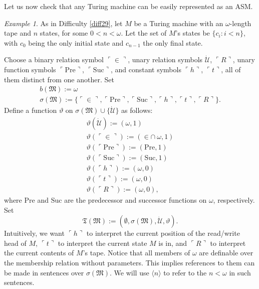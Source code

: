 \documentclass[12pt, twoside]{memoir}
\numberwithin{equation}{section}
\theoremstyle{definition}
\theoremstyle{remark}
\newtheorem{ex}[thm]{Example}
\theoremstyle{definition}
\theoremstyle{definition}
\theoremstyle{definition}
\theoremstyle{remark}
\begin{document}
Let us now check that any Turing machine can be easily represented as an ASM.

\begin{ex}\label{ex212}
As in Difficulty \ref{diff29}, let $M$ be a Turing machine with an $\omega$-length tape and $n$ states, for some $0 < n < \omega$. Let the set of $M$'s states be $\{c_i : i < n\}$, with $c_0$ being the only initial state and $c_{n-1}$ the only final state. 

Choose a binary relation symbol $\ulcorner \in \urcorner$, unary relation symbols $\dot{\mathcal{U}}$, $\ulcorner R \urcorner$, unary function symbols $\ulcorner \mathrm{Pre} \urcorner$, $\ulcorner \mathrm{Suc} \urcorner$, and constant symbols $\ulcorner h \urcorner$, $\ulcorner t \urcorner$, all of them distinct from one another. Set 
\begin{gather*}
    b(\mathfrak{M}) := \omega \\
    \sigma(\mathfrak{M}) := \{\ulcorner \in \urcorner, \ulcorner \mathrm{Pre} \urcorner, \ulcorner \mathrm{Suc} \urcorner, \ulcorner h \urcorner, \ulcorner t \urcorner, \ulcorner R \urcorner\} \text{.}
\end{gather*}
Define a function $\vartheta$ on $\sigma(\mathfrak{M}) \cup \{\dot{\mathcal{U}}\}$ as follows:
\begin{gather*}
    \vartheta(\dot{\mathcal{U}}) := (\omega, 1) \\
    \vartheta(\ulcorner \in \urcorner) := (\in \cap \ \omega, 1) \\
    \vartheta(\ulcorner \mathrm{Pre} \urcorner) := (\mathrm{Pre}, 1) \\
    \vartheta(\ulcorner \mathrm{Suc} \urcorner) := (\mathrm{Suc}, 1) \\
    \vartheta(\ulcorner h \urcorner) := (\omega, 0) \\
    \vartheta(\ulcorner t \urcorner) := (\omega, 0) \\
    \vartheta(\ulcorner R \urcorner) := (\omega, 0) \text{,}
\end{gather*}
where $\mathrm{Pre}$ and $\mathrm{Suc}$ are the predecessor and successor functions on $\omega$, respectively. Set
\begin{equation*}
    \mathfrak{T}(\mathfrak{M}) := (\emptyset, \sigma(\mathfrak{M}), \dot{\mathcal{U}}, \vartheta) \text{.}
\end{equation*}
Intuitively, we want $\ulcorner h \urcorner$ to interpret the current position of the read/write head of $M$, $\ulcorner t \urcorner$ to interpret the current state $M$ is in, and $\ulcorner R \urcorner$ to interpret the current contents of $M$'s tape. Notice that all members of $\omega$ are definable over the membership  relation without parameters. This implies references to them can be made in sentences over $\sigma(\mathfrak{M})$. We will use $\langle n \rangle$ to refer to the $n < \omega$ in such sentences. 


\end{ex}
\end{document}
